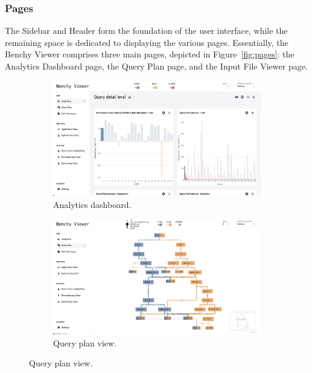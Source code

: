 \subsubsection{Pages}

The Sidebar and Header form the foundation of the user interface, while the remaining space is dedicated to displaying the various pages. Essentially, the Benchy Viewer comprises three main pages, depicted in Figure~\ref{fig:pages}: the Analytics Dashboard page, the Query Plan page, and the Input File Viewer page.

\begin{figure}[h]
  \centering
  \begin{subfigure}[b]{0.3\linewidth}
    \includegraphics[width=\linewidth]{figures/app.png}
    \caption{Analytics dashboard.}
      \label{fig:app-page}
  \end{subfigure}
  \hspace{0.5cm} %
  \begin{subfigure}[b]{0.3\linewidth}
    \includegraphics[width=\linewidth]{figures/app-query-plan.png}
    \caption{Query plan view.}

\end{subfigure}
\end{figure}
